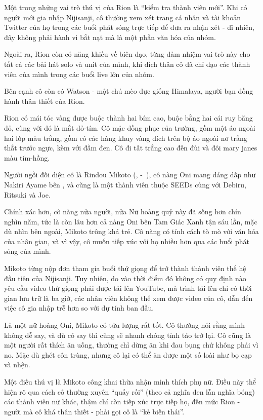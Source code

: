\documentclass[../main.tex]{subfiles}
\begin{document}
Một trong những vai trò thú vị của Rion là ``kiểm tra thành viên mới''. Khi có người mới gia nhập Nijisanji, cô thường xem xét trang cá nhân và tài khoản Twitter của họ trong các buổi phát sóng trực tiếp để đưa ra nhận xét - dĩ nhiên, đây không phải hành vi bắt nạt mà là một phần văn hóa của nhóm.

Ngoài ra, Rion còn có năng khiếu về biên đạo, từng đảm nhiệm vai trò này cho tất cả các bài hát solo và unit của mình, khi đích thân cô đã chỉ đạo các thành viên của mình trong các buổi live lớn của nhóm.

Bên cạnh cô còn có Watson - một chú mèo đực giống Himalaya, người bạn đồng hành thân thiết của Rion.

Rion có mái tóc vàng được buộc thành hai bím cao, buộc bằng hai cái ruy băng đỏ, cùng với đó là mắt đỏ-tím. Cô mặc đồng phục của trường, gồm một áo ngoài hai lớp màu trắng, gồm có các hàng khuy vàng đích trên bộ áo ngoài nơ trắng thắt trước ngực, kèm với đầm đen. Cô đi tất trắng cao đến đùi và đôi mary janes màu tím-hồng.


Người ngồi đối diện cô là Rindou Mikoto (, -\ ), cô nàng Oni mang dáng dấp như Nakiri Ayame bên \hll, và cũng là một thành viên thuộc SEEDs cùng với Debiru, Ritsuki và Joe.

Chính xác hơn, cô nàng nửa người, nửa Nữ hoàng quỷ này đã sống hơn chín nghìn năm, tức là còn lâu hơn cả nàng Oni bên Tam Giác Xanh tận sáu lần, mặc dù nhìn bên ngoài, Mikoto trông khá trẻ. Cô nàng có tính cách tò mò với văn hóa của nhân gian, và vì vậy, cô muốn tiếp xúc với họ nhiều hơn qua các buổi phát sóng của mình.

Mikoto từng nộp đơn tham gia buổi thử giọng để trở thành thành viên thế hệ đầu tiên của Nijisanji. Tuy nhiên, do vào thời điểm đó không có quy định nào yêu cầu video thử giọng phải được tải lên YouTube, mà trình tải lên chỉ có thời gian lưu trữ là ba giờ, các nhân viên không thể xem được video của cô, dẫn đến việc cô gia nhập trễ hơn so với dự tính ban đầu.

Là một nữ hoàng Oni, Mikoto có tửu lượng rất tốt. Cô thường nói rằng mình không dễ say, và dù có say thì cũng sẽ nhanh chóng tỉnh táo trở lại. Cô cũng là một người rất thích ăn uống, thường chỉ dừng ăn khi đau bụng chứ không phải vì no. Mặc dù ghét côn trùng, nhưng cô lại có thể ăn được một số loài như bọ cạp và nhện.

Một điều thú vị là Mikoto công khai thừa nhận mình thích phụ nữ. Điều này thể hiện rõ qua cách cô thường xuyên ``quấy rối'' (theo cả nghĩa đen lẫn nghĩa bóng) các thành viên nữ khác, thậm chí còn tiếp xúc trực tiếp họ, đến mức Rion - người mà cô khá thân thiết - phải gọi cô là ``kẻ biến thái''.
\end{document}
